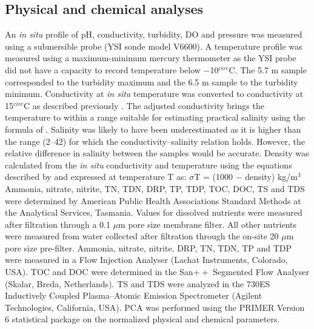 \subsection{Physical and chemical analyses}
 An \emph{in situ} profile of pH, conductivity, turbidity, \ac{DO} and pressure was measured using a submersible probe (YSI sonde model V6600). 
A temperature profile was measured using a maximum-minimum mercury thermometer as the YSI probe did not have a capacity to record temperature below $-$10$^{circ}$C. 
The 5.7 m sample corresponded to the turbidity maximum and the 6.5 m sample to the turbidity minimum. 
Conductivity at \emph{in situ} temperature was converted to conductivity at 15$^{circ}$C as described previously \cite{Gibson1999}. 
The adjusted conductivity brings the temperature to within a range suitable for estimating practical salinity using the formula of \citet{Fofonoff1983}. 
Salinity was likely to have been underestimated as it is higher than the range (2--42) for which the conductivity–salinity relation holds. 
However, the relative difference in salinity between the samples would be accurate. 
Density was calculated from the \emph{in situ} conductivity and temperature using the equations described by \citet{Gibson1990} and expressed at temperature T as:
$\sigma$T = (1000 $-$ density) kg/m$^3$
Ammonia, nitrate, nitrite, \ac{TN}, \ac{TDN}, \ac{DRP}, \ac{TP}, \ac{TDP}, \ac{TOC}, \ac{DOC}, \ac{TS} and \ac{TDS} were determined by American Public Health Associations Standard Methods at the Analytical Services, Tasmania. 
Values for dissolved nutrients were measured after filtration through a 0.1 $\mu$m pore size membrane filter. 
All other nutrients were measured from water collected after filtration through the on-site 20 $\mu$m pore size pre-filter. 
Ammonia, nitrate, nitrite, \ac{DRP}, \ac{TN}, \ac{TDN}, \ac{TP} and \ac{TDP} were measured in a Flow Injection Analyser (Lachat Instruments, Colorado, USA). 
\ac{TOC} and \ac{DOC} were determined in the San$++$ Segmented Flow Analyser (Skalar, Breda, Netherlands). 
\ac{TS} and \ac{TDS} were analyzed in the 730ES Inductively Coupled Plasma–Atomic Emission Spectrometer (Agilent Technologies, California, USA). 
\ac{PCA} was performed using the PRIMER Version 6 statistical package \cite{Clarke2006} on the normalized physical and chemical parameters.

